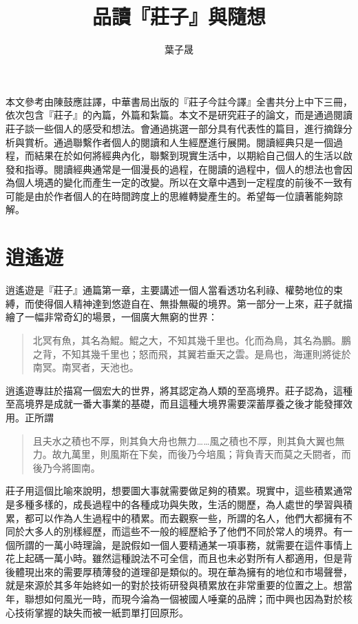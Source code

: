 \documentclass[12pt,a4paper]{article}
\begin{document}
\begin{CJK*}{UTF8}{bsmi}
    
    \title{品讀『莊子』與隨想}
    \author{葉子晟}
    \date{}
    \maketitle
    
    \small
    本文參考由陳鼓應註譯，中華書局出版的『莊子今註今譯』全書共分上中下三冊，依次包含『莊子』的內篇，外篇和紮篇。本文不是研究莊子的論文，而是通過閱讀莊子談一些個人的感受和想法。會通過挑選一部分具有代表性的篇目，進行摘錄分析與賞析。通過聯繫作者個人的閱讀和人生經歷進行展開。閱讀經典只是一個過程，而結果在於如何將經典內化，聯繫到現實生活中，以期給自己個人的生活以啟發和指導。閱讀經典通常是一個漫長的過程，在閱讀的過程中，個人的想法也會因為個人境遇的變化而產生一定的改變。所以在文章中遇到一定程度的前後不一致有可能是由於作者個人的在時間跨度上的思維轉變產生的。希望每一位讀著能夠諒解。

    \normalsize

    \section{逍遙遊}
    逍遙遊是『莊子』通篇第一章，主要講述一個人當看透功名利祿、權勢地位的束縛，而使得個人精神達到悠遊自在、無掛無礙的境界。第一部分一上來，莊子就描繪了一幅非常奇幻的場景，一個廣大無窮的世界：
    \begin{quotation}
        北冥有魚，其名為鯤。鯤之大，不知其幾千里也。化而為鳥，其名為鵬。鵬之背，不知其幾千里也；怒而飛，其翼若垂天之雲。是鳥也，海運則將徙於南冥。南冥者，天池也。
    \end{quotation}
    逍遙遊專註於描寫一個宏大的世界，將其認定為人類的至高境界。莊子認為，這種至高境界是成就一番大事業的基礎，而且這種大境界需要深蓄厚養之後才能發揮效用。正所謂
    \begin{quotation}
        且夫水之積也不厚，則其負大舟也無力……風之積也不厚，則其負大翼也無力。故九萬里，則風斯在下矣，而後乃今培風；背負青天而莫之夭閼者，而後乃今將圖南。
    \end{quotation}
    莊子用這個比喻來說明，想要圖大事就需要做足夠的積累。現實中，這些積累通常是多種多樣的，成長過程中的各種成功與失敗，生活的閱歷，為人處世的學習與積累，都可以作為人生過程中的積累。而去觀察一些，所謂的名人，他們大都擁有不同於大多人的別樣經歷，而這些不一般的經歷給予了他們不同於常人的境界。有一個所謂的一萬小時理論，是說假如一個人要精通某一項事務，就需要在這件事情上花上起碼一萬小時。雖然這種說法不可全信，而且也未必對所有人都適用，但是背後體現出來的需要厚積薄發的道理卻是類似的。現在華為擁有的地位和市場聲譽，就是來源於其多年始終如一的對於技術研發與積累放在非常重要的位置之上。想當年，聯想如何風光一時，而現今淪為一個被國人唾棄的品牌；而中興也因為對於核心技術掌握的缺失而被一紙罰單打回原形。


\end{CJK*}
\end{document}
